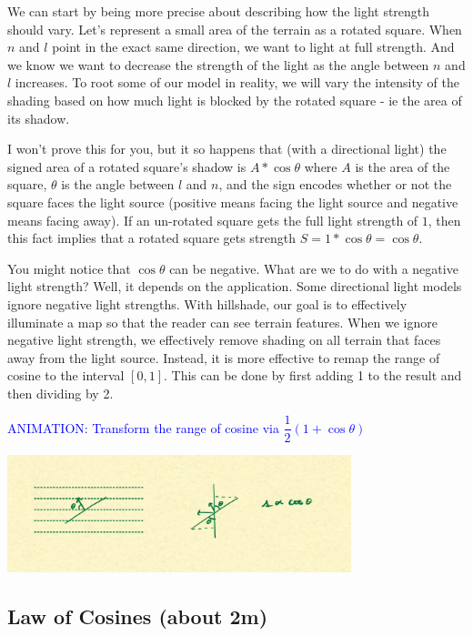 \documentclass{article}
\newcommand\animation[1]{\textcolor{blue}{ANIMATION: #1}}
\begin{document}
We can start by being more precise about describing how the light strength should vary.
Let's represent a small area of the terrain as a rotated square.
When $n$ and $l$ point in the exact same direction, we want to light at full strength.
And we know we want to decrease the strength of the light as the angle between $n$ and $l$ increases.
To root some of our model in reality, we will vary the intensity of the shading based on how much light is blocked by the rotated square - ie the area of its shadow.

I won't prove this for you, but it so happens that (with a directional light) the signed area of a rotated square's shadow is $A * \cos \theta$ where $A$ is the area of the square, $\theta$ is the angle between $l$ and $n$, and the sign encodes whether or not the square faces the light source (positive means facing the light source and negative means facing away).
If an un-rotated square gets the full light strength of $1$, then this fact implies that a rotated square gets strength $S = 1 * \cos \theta = \cos \theta$.

You might notice that $\cos \theta$ can be negative.
What are we to do with a negative light strength?
Well, it depends on the application.
Some directional light models ignore negative light strengths.
With hillshade, our goal is to effectively illuminate a map so that the reader can see terrain features.
When we ignore negative light strength, we effectively remove shading on all terrain that faces away from the light source.
Instead, it is more effective to remap the range of cosine to the interval $[0, 1]$.
This can be done by first adding 1 to the result and then dividing by 2.
 
\animation{Transform the range of cosine via $\dfrac{1}{2}(1 + \cos \theta)$}

\begin{center}
	\includegraphics[width=0.75\textwidth,frame]{assets/cosine.jpg}
\end{center}

\subsection{Law of Cosines (about 2m)}
\end{document}
